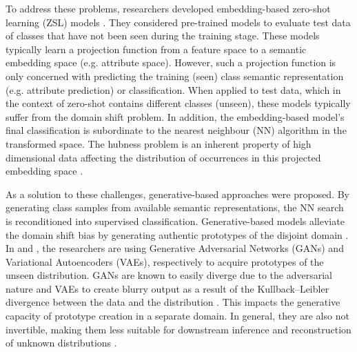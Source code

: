 \documentclass{article}
\begin{document}
To address these problems, researchers developed embedding-based zero-shot learning (ZSL) models \cite{b1, b2, b3, b4}. They considered pre-trained models to evaluate test data of classes that have not been seen during the training stage. These models typically learn a projection function from a feature space to a semantic embedding space (e.g. attribute space). However, such a projection function is only concerned with predicting the training (seen) class semantic representation (e.g. attribute prediction) or classification. When applied to test data, which in the context of zero-shot contains different classes (unseen), these models typically suffer from the domain shift problem. In addition, the embedding-based model's final classification is subordinate to the nearest neighbour (NN) algorithm in the transformed space. The hubness problem is an inherent property of high dimensional data affecting the distribution of occurrences in this projected embedding space \cite{b49}. 

As a solution to these challenges, generative-based approaches \cite{b44, b8, b61, b62} were proposed. By generating class samples from available semantic representations, the NN search is reconditioned into supervised classification. Generative-based models alleviate the domain shift bias by generating authentic prototypes of the disjoint domain \cite{b63}. In \cite{b5}\cite{b7} and \cite{b8, b9}, the researchers are using Generative Adversarial Networks (GANs) and Variational Autoencoders (VAEs), respectively to acquire prototypes of the unseen distribution. GANs are known to easily diverge due to the adversarial nature \cite{b12} and VAEs to create blurry output as a result of the Kullback–Leibler divergence between the data and the distribution \cite{b13}. This impacts the generative capacity of prototype creation in a separate domain. In general, they are also not invertible, making them less suitable for downstream inference and reconstruction of unknown distributions \cite{b75}.
\end{document}

